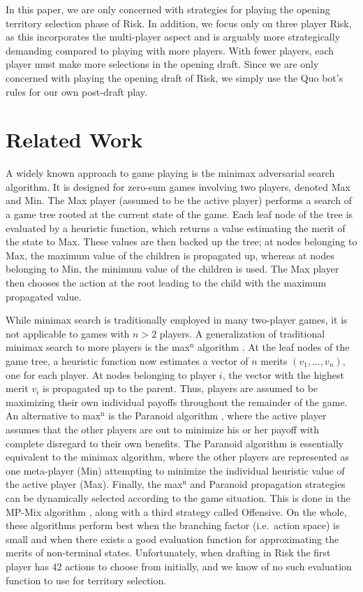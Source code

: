 \documentclass[letterpaper]{article}
\numberwithin{equation}{section}
\numberwithin{theorem}{section}
\numberwithin{lemma}{section}
\numberwithin{df}{section}
\begin{document}
In this paper, we are only concerned with strategies for playing the opening territory selection phase of Risk.  In addition, we focus only on three player Risk, as this incorporates the multi-player aspect and is arguably more strategically demanding compared to playing with more players.  With fewer players, each player must make more selections in the opening draft.  Since we are only concerned with playing the opening draft of Risk, we simply use the Quo bot's rules for our own post-draft play. 

\section{Related Work}

A widely known approach to game playing is the minimax adversarial search algorithm.  It is designed for zero-sum games involving two players, denoted Max and Min.  The Max player (assumed to be the active player) performs a search of a game tree rooted at the current state of the game.  Each leaf node of the tree is evaluated by a heuristic function, which returns a value estimating the merit of the state to Max.  These values are then backed up the tree; at nodes belonging to Max, the maximum value of the children is propagated up, whereas at nodes belonging to Min, the minimum value of the children is used.  The Max player then chooses the action at the root leading to the child with the maximum propagated value.


While minimax search is traditionally employed in many two-player games, it is not applicable to games with $n > 2$ players.  A generalization of traditional minimax search to more players is the max$^\text{n}$ algorithm \cite{MaxN}.  At the leaf nodes of the game tree, a heuristic function now estimates a vector of $n$ merits $(v_1, ..., v_n)$, one for each player.  At nodes belonging to player $i$, the vector with the highest merit $v_i$ is propagated up to the parent.  Thus, players are assumed to be maximizing their own individual payoffs throughout the remainder of the game.  An alternative to max$^\text{n}$ is the Paranoid algorithm \cite{Paranoid}, where the active player assumes that the other players are out to minimize his or her payoff with complete disregard to their own benefits.  The Paranoid algorithm is essentially equivalent to the minimax algorithm, where the other players are represented as one meta-player (Min) attempting to minimize the individual heuristic value of the active player (Max).  Finally, the max$^\text{n}$ and Paranoid propagation strategies can be dynamically selected according to the game situation.  This is done in the MP-Mix algorithm \cite{ZuckFelnerKraus2009}, along with a third strategy called Offensive.  On the whole, these algorithms perform best when the branching factor (i.e.~action space) is small and when there exists a good evaluation function for approximating the merits of non-terminal states.  Unfortunately, when drafting in Risk the first player has 42 actions to choose from initially, and we know of no such evaluation function to use for territory selection.
\end{document}
